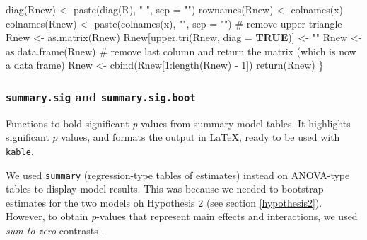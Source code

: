 \documentclass[
  bookmarksnumbered]{article}
\newenvironment{Shaded}{\begin{snugshade}}{\end{snugshade}}
\newcommand{\AttributeTok}[1]{\textcolor[rgb]{0.80,0.80,0.80}{#1}}
\newcommand{\CommentTok}[1]{\textcolor[rgb]{0.50,0.62,0.50}{#1}}
\newcommand{\ConstantTok}[1]{\textcolor[rgb]{0.86,0.64,0.64}{\textbf{#1}}}
\newcommand{\DecValTok}[1]{\textcolor[rgb]{0.86,0.86,0.80}{#1}}
\newcommand{\FunctionTok}[1]{\textcolor[rgb]{0.94,0.94,0.56}{#1}}
\newcommand{\NormalTok}[1]{\textcolor[rgb]{0.80,0.80,0.80}{#1}}
\newcommand{\OtherTok}[1]{\textcolor[rgb]{0.94,0.94,0.56}{#1}}
\newcommand{\SpecialCharTok}[1]{\textcolor[rgb]{0.86,0.64,0.64}{#1}}
\newcommand{\StringTok}[1]{\textcolor[rgb]{0.80,0.58,0.58}{#1}}
\begin{document}
\begin{Shaded}
\begin{Highlighting}[]
  \FunctionTok{diag}\NormalTok{(Rnew) }\OtherTok{\textless{}{-}} \FunctionTok{paste}\NormalTok{(}\FunctionTok{diag}\NormalTok{(R), }\StringTok{" "}\NormalTok{, }
                      \AttributeTok{sep =} \StringTok{""}\NormalTok{)}
  \FunctionTok{rownames}\NormalTok{(Rnew) }\OtherTok{\textless{}{-}} \FunctionTok{colnames}\NormalTok{(x)}
  \FunctionTok{colnames}\NormalTok{(Rnew) }\OtherTok{\textless{}{-}} \FunctionTok{paste}\NormalTok{(}\FunctionTok{colnames}\NormalTok{(x), }\StringTok{""}\NormalTok{, }
                          \AttributeTok{sep =} \StringTok{""}\NormalTok{)}
  \CommentTok{\# remove upper triangle}
\NormalTok{  Rnew }\OtherTok{\textless{}{-}} \FunctionTok{as.matrix}\NormalTok{(Rnew)}
\NormalTok{  Rnew[}\FunctionTok{upper.tri}\NormalTok{(Rnew, }\AttributeTok{diag =} \ConstantTok{TRUE}\NormalTok{)] }\OtherTok{\textless{}{-}} \StringTok{""}
\NormalTok{  Rnew }\OtherTok{\textless{}{-}} \FunctionTok{as.data.frame}\NormalTok{(Rnew)}
  \CommentTok{\# remove last column and return the matrix (which is now a data frame)}
\NormalTok{  Rnew }\OtherTok{\textless{}{-}} \FunctionTok{cbind}\NormalTok{(Rnew[}\DecValTok{1}\SpecialCharTok{:}\FunctionTok{length}\NormalTok{(Rnew) }\SpecialCharTok{{-}} \DecValTok{1}\NormalTok{])}
  \FunctionTok{return}\NormalTok{(Rnew)}
\NormalTok{\}}
\end{Highlighting}
\end{Shaded}

\hypertarget{summary.sig-and-summary.sig.boot}{%
\subsubsection{\texorpdfstring{\texttt{summary.sig} and \texttt{summary.sig.boot}}{summary.sig and summary.sig.boot}}\label{summary.sig-and-summary.sig.boot}}

Functions to bold significant \emph{p} values from summary model tables. It highlights significant \(p\) values, and formats the output in \LaTeX, ready to be used with \texttt{kable}.

We used \texttt{summary} (regression-type tables of estimates) instead on ANOVA-type tables to display model results. This was because we needed to bootstrap estimates for the two models oh Hypothesis 2 (see section \ref{hypothesis2}). However, to obtain \emph{p}-values that represent main effects and interactions, we used \emph{sum-to-zero} contrasts \autocites[see e.g.,][]{kaufmanContrastCodingLeast1974,keppelDataAnalysisResearch1989}.
\end{document}

